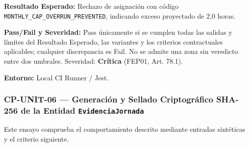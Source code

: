 \par\noindent\textbf{Resultado Esperado:} Rechazo de asignación con código \texttt{M\allowbreak{}O\allowbreak{}N\allowbreak{}T\allowbreak{}H\allowbreak{}L\allowbreak{}Y\allowbreak{}\_\allowbreak{}C\allowbreak{}A\allowbreak{}P\allowbreak{}\_\allowbreak{}O\allowbreak{}V\allowbreak{}E\allowbreak{}R\allowbreak{}R\allowbreak{}U\allowbreak{}N\allowbreak{}\_\allowbreak{}P\allowbreak{}R\allowbreak{}E\allowbreak{}V\allowbreak{}E\allowbreak{}N\allowbreak{}T\allowbreak{}E\allowbreak{}D\allowbreak{}}, indicando exceso proyectado de 2,0 horas.\par
\par\noindent\textbf{Pass/Fail y Severidad:} Pass únicamente si se cumplen todas las salidas y límites del Resultado Esperado, las variantes y los criterios contractuales aplicables; cualquier discrepancia es Fail. No se admite una zona sin veredicto entre dos umbrales. Severidad: \textbf{Crítica} (FEP01, Art. 78.1).\par
\par\noindent\textbf{Entorno:} Local CI Runner / Jest.\par






\subsubsection*{CP-UNIT-06 — Generación y Sellado Criptográfico SHA-256 de la Entidad \texttt{E\allowbreak{}v\allowbreak{}i\allowbreak{}d\allowbreak{}e\allowbreak{}n\allowbreak{}c\allowbreak{}i\allowbreak{}a\allowbreak{}J\allowbreak{}o\allowbreak{}r\allowbreak{}n\allowbreak{}a\allowbreak{}d\allowbreak{}a\allowbreak{}}}\label{sec:9-cp-unit-06}
Este ensayo comprueba el comportamiento descrito mediante entradas sintéticas y el criterio siguiente.

